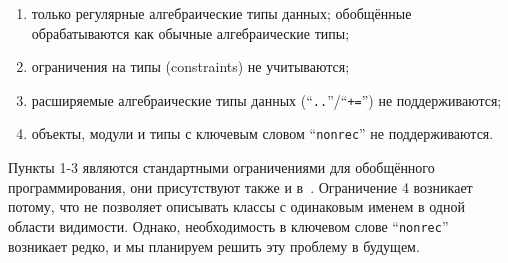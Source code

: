 \begin{enumerate}
\item только регулярные алгебраические типы данных; обобщённые~\cite{GADT} обрабатываются как обычные алгебраические типы;
\item ограничения на типы (constraints) не учитываются;
\item расширяемые алгебраические типы данных
(``\lstinline{..}''/``\lstinline{+=}'') не поддерживаются;
\item объекты, модули и типы с ключевым словом ``\lstinline{nonrec}'' не поддерживаются.
\end{enumerate}

\noindent Пункты 1-3 являются стандартными ограничениями для обобщённого программирования, они присутствуют также и в~\cite{ppxderiving}. Ограничение 4 возникает потому, что \ocaml{} не позволяет описывать классы с одинаковым именем в одной области видимости. Однако,  необходимость в ключевом слове ``\lstinline{nonrec}'' возникает редко, и мы планируем решить эту проблему в будущем.













